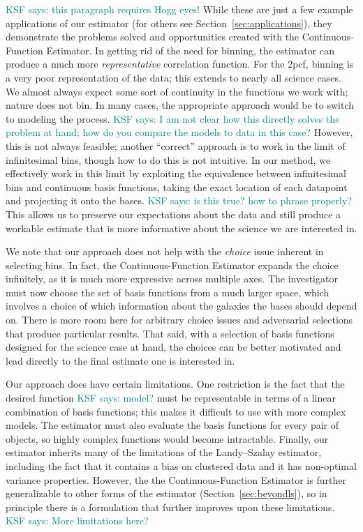 \documentclass[modern]{aastex62}
\newcommand{\cf}{2pcf\xspace} %
\newcommand{\est}{the Continuous-Function Estimator\xspace}
\newcommand{\KSF}[1]{\textcolor{teal}{KSF says: #1}}
\begin{document}
\KSF{this paragraph requires Hogg eyes!}
While these are just a few example applications of our estimator (for others see Section~\ref{sec:applications}), they demonstrate the problems solved and opportunities created with \est.
In getting rid of the need for binning, the estimator can produce a much more \textit{representative} correlation function.
For the \cf, binning is a very poor representation of the data; this extends to nearly all science cases. 
We almost always expect some sort of continuity in the functions we work with; nature does not bin.
In many cases, the appropriate approach would be to switch to modeling the process. \KSF{I am not clear how this directly solves the problem at hand; how do you compare the models to data in this case?}
However, this is not always feasible; another ``correct'' approach is to work in the limit of infinitesimal bins, though how to do this is not intuitive.
In our method, we effectively work in this limit by exploiting the equivalence between infinitesimal bins and continuous basis functions, taking the exact location of each datapoint and projecting it onto the bases. \KSF{is this true? how to phrase properly?}
This allows us to preserve our expectations about the data and still produce a workable estimate that is more informative about the science we are interested in.

We note that our approach does not help with the \textit{choice} issue inherent in selecting bins.
In fact, \est expands the choice infinitely, as it is much more expressive across multiple axes.
The investigator must now choose the set of basis functions from a much larger space, which involves a choice of which information about the galaxies the bases should depend on.
There is more room here for arbitrary choice issues and adversarial selections that produce particular results.
That said, with a selection of basis functions designed for the science case at hand, the choices can be better motivated and lead directly to the final estimate one is interested in.  

Our approach does have certain limitations.
One restriction is the fact that the desired function \KSF{model?} must be representable in terms of a linear combination of basis functions; this makes it difficult to use with more complex models.
The estimator must also evaluate the basis functions for every pair of objects, so highly complex functions would become intractable.
Finally, our estimator inherits many of the limitations of the Landy--Szalay estimator, including the fact that it contains a bias on clustered data and it has non-optimal variance properties.
However, the \est is further generalizable to other forms of the estimator (Section~\ref{sec:beyondls}), so in principle there is a formulation that further improves upon these limitations.
\KSF{More limitations here?}
\end{document}
